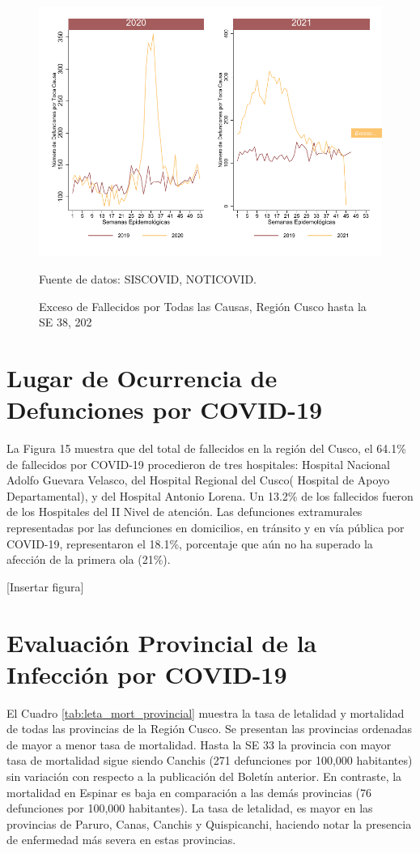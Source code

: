 \documentclass[12pt,a4paper,openany]{book}
\begin{document}
	\begin{figure}[h]
	\caption{Exceso de Fallecidos por  Todas las Causas, Región Cusco hasta la SE 38, 202}\label{fig:exceso_regional}
	\begin{center}
		\includegraphics[width=0.65\linewidth]{../figuras/exceso_region}
	\end{center}
	{\footnotesize {Fuente de datos: SISCOVID, NOTICOVID.}}
	\end{figure}

\clearpage
	\section*{Lugar de Ocurrencia de Defunciones por COVID-19}
	\noindent La Figura 15 muestra que del total de fallecidos en la región del Cusco, el 64.1\% de fallecidos por COVID-19 procedieron de tres hospitales: Hospital Nacional Adolfo Guevara Velasco, del Hospital Regional del Cusco( Hospital de Apoyo Departamental), y del Hospital Antonio Lorena. Un 13.2\% de los fallecidos fueron de los Hospitales del II Nivel de atención. Las defunciones extramurales representadas por las defunciones en domicilios, en tránsito y en vía pública por COVID-19, representaron el 18.1\%, porcentaje que aún no ha superado la afección de la primera ola (21\%).

[Insertar figura]

\clearpage
	\section*{Evaluación Provincial de la Infección por COVID-19}
	\noindent El Cuadro \ref{tab:leta_mort_provincial} muestra la tasa de letalidad y mortalidad de todas las provincias de la Región Cusco. Se presentan las provincias ordenadas de mayor a menor tasa de mortalidad. Hasta la SE 33 la provincia con mayor tasa de mortalidad sigue siendo Canchis (271 defunciones por 100,000 habitantes) sin variación con respecto a la publicación del Boletín anterior. En contraste, la mortalidad en Espinar es baja en comparación a las demás provincias (76 defunciones por 100,000 habitantes). La tasa de letalidad, es mayor en las provincias de Paruro, Canas, Canchis y Quispicanchi, haciendo notar la presencia de enfermedad más severa en estas provincias. 
\end{document}
